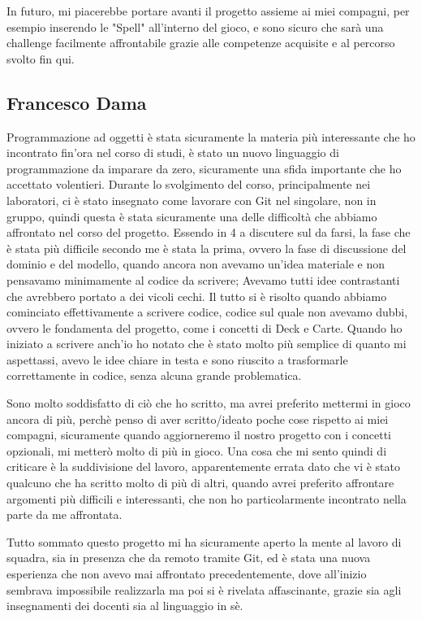 In futuro, mi piacerebbe portare avanti il progetto assieme ai miei compagni, per esempio inserendo le "Spell" all'interno del gioco, e sono sicuro che sarà una challenge facilmente affrontabile grazie alle competenze acquisite e al percorso svolto fin qui.

\subsection{Francesco Dama}

Programmazione ad oggetti è stata sicuramente la materia più interessante che ho incontrato fin'ora nel corso di studi, è stato un nuovo
linguaggio di programmazione da imparare da zero, sicuramente una sfida importante che ho accettato volentieri.
Durante lo svolgimento del corso, principalmente nei laboratori, ci è stato insegnato come lavorare con Git nel singolare, non in gruppo,
quindi questa è stata sicuramente una delle difficoltà che abbiamo affrontato nel corso del progetto.
Essendo in 4 a discutere sul da farsi, la fase che è stata più difficile secondo me è stata la prima, ovvero la fase di discussione del dominio
e del modello, quando ancora non avevamo un'idea materiale e non pensavamo minimamente al codice da scrivere; Avevamo tutti idee contrastanti
che avrebbero portato a dei vicoli cechi.
Il tutto si è risolto quando abbiamo cominciato effettivamente a scrivere codice, codice sul quale non avevamo dubbi, ovvero le fondamenta
del progetto, come i concetti di Deck e Carte.
Quando ho iniziato a scrivere anch'io ho notato che è stato molto più semplice di quanto mi aspettassi, avevo le idee chiare in testa e sono
riuscito a trasformarle correttamente in codice, senza alcuna grande problematica.

Sono molto soddisfatto di ciò che ho scritto, ma avrei preferito mettermi in gioco ancora di più, perchè penso di aver scritto/ideato
poche cose rispetto ai miei compagni, sicuramente quando aggiorneremo il nostro progetto con i concetti opzionali, mi metterò molto di più
in gioco.
Una cosa che mi sento quindi di criticare è la suddivisione del lavoro, apparentemente errata dato che vi è stato qualcuno che ha scritto
molto di più di altri, quando avrei preferito affrontare argomenti più difficili e interessanti, che non ho particolarmente incontrato nella 
parte da me affrontata.

Tutto sommato questo progetto mi ha sicuramente aperto la mente al lavoro di squadra, sia in presenza che da remoto tramite Git, ed è stata
una nuova esperienza che non avevo mai affrontato precedentemente, dove all'inizio sembrava impossibile realizzarla ma poi si è rivelata 
affascinante, grazie sia agli insegnamenti dei docenti sia al linguaggio in sè.

